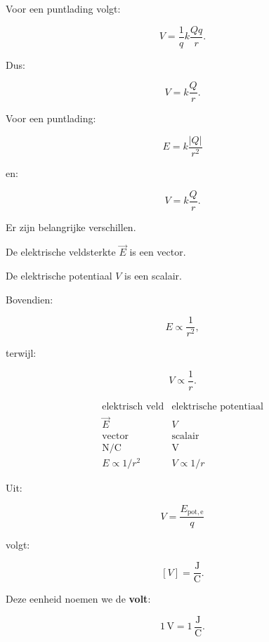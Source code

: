 \documentclass{ximera}
\begin{document}
Voor een puntlading volgt:

\[
V
=
\frac{1}{q}
k\frac{Qq}{r}.
\]

Dus:

\[
\boxed{
V
=
k\frac{Q}{r}.
}
\]




Voor een puntlading:

\[
\boxed{
E
=
k\frac{|Q|}{r^2}
}
\]

en:

\[
\boxed{
V
=
k\frac{Q}{r}.
}
\]

Er zijn belangrijke verschillen.

De elektrische veldsterkte $\vec E$ is een vector.

De elektrische potentiaal $V$ is een scalair.

Bovendien:

\[
E\propto\frac1{r^2},
\]

terwijl:

\[
V\propto\frac1r.
\]


\begin{center}
\[
\boxed{
\begin{array}{c|c}
\text{elektrisch veld} & \text{elektrische potentiaal}\\
\hline
\vec E & V\\
\text{vector} & \text{scalair}\\
\mathrm{N/C} & \mathrm V\\
E\propto1/r^2 & V\propto1/r
\end{array}
}
\]
\end{center}




Uit:

\[
V=\frac{E_{\mathrm{pot,e}}}{q}
\]

volgt:

\[
[V]=\frac{\mathrm J}{\mathrm C}.
\]

Deze eenheid noemen we de \textbf{volt}:

\[
\boxed{
1\,\mathrm V
=
1\,\frac{\mathrm J}{\mathrm C}.
}
\]
\end{document}
